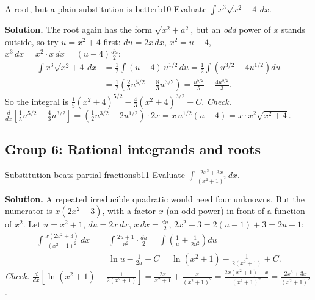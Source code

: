 \documentclass[11pt]{article}
\begin{document}
\begin{exmp}{A root, but a plain substitution is better}{b10}
Evaluate $\displaystyle\int x^3\sqrt{x^2+4}\,dx$.

\textbf{Solution.} The root again has the form $\sqrt{x^2+a^2}$, but an \emph{odd} power of $x$ stands outside, so try $u=x^2+4$ first: $du=2x\,dx$, $x^2=u-4$, $x^3\,dx=x^2\cdot x\,dx=(u-4)\frac{du}2$:
\begin{align*}\int x^3\sqrt{x^2+4}\,dx&=\frac12\int(u-4)\,u^{1/2}\,du=\frac12\int\left(u^{3/2}-4u^{1/2}\right)du\\&=\frac12\left(\frac25u^{5/2}-\frac83u^{3/2}\right)=\frac{u^{5/2}}5-\frac{4u^{3/2}}3 .\end{align*}
So the integral is $\frac15\left(x^2+4\right)^{5/2}-\frac43\left(x^2+4\right)^{3/2}+C$.
\emph{Check.} $\frac d{dx}\left[\frac15u^{5/2}-\frac43u^{3/2}\right]=\left(\frac12u^{3/2}-2u^{1/2}\right)\cdot2x=x\,u^{1/2}(u-4)=x\cdot x^2\sqrt{x^2+4}$.
\end{exmp}

\subsection*{Group 6: Rational integrands and roots}

\begin{exmp}{Substitution beats partial fractions}{b11}
Evaluate $\displaystyle\int\frac{2x^3+3x}{\left(x^2+1\right)^2}\,dx$.

\textbf{Solution.} A repeated irreducible quadratic would need four unknowns. But the numerator is $x(2x^2+3)$, with a factor $x$ (an odd power) in front of a function of $x^2$. Let $u=x^2+1$, $du=2x\,dx$, $x\,dx=\frac{du}2$, $2x^2+3=2(u-1)+3=2u+1$:
\begin{align*}\int\frac{x(2x^2+3)}{(x^2+1)^2}\,dx&=\int\frac{2u+1}{u^2}\cdot\frac{du}2=\int\left(\frac1u+\frac1{2u^2}\right)du\\&=\ln u-\frac1{2u}+C=\ln\left(x^2+1\right)-\frac1{2(x^2+1)}+C .\end{align*}
\emph{Check.} $\frac d{dx}\left[\ln(x^2+1)-\frac1{2(x^2+1)}\right]=\frac{2x}{x^2+1}+\frac{x}{(x^2+1)^2}=\frac{2x(x^2+1)+x}{(x^2+1)^2}=\frac{2x^3+3x}{(x^2+1)^2}$.
\end{exmp}
\end{document}
